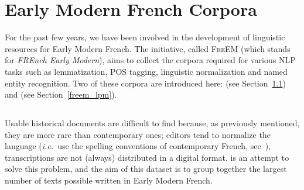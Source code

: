 \section{Early Modern French Corpora}\label{data-freem}

For the past few years, we have been involved in the development of linguistic resources for Early Modern French. The initiative, called \textsc{FreEM} (which stands for \emph{FREnch Early Modern}), aims to collect the corpora required for various NLP tasks such as lemmatization, POS tagging, linguistic normalization and named entity recognition. Two of these corpora are introduced here: \freemmax (see Section~\ref{freem_max}) and \freemlpm (see Section~\ref{freem_lpm}).

\subsection{\texorpdfstring{\freemmax}{FREEM max}}\label{freem_max}

Usable historical documents are difficult to find because, as previously mentioned, they are more rare than contemporary ones; editors tend to normalize the language (\emph{i.e.}~use the spelling conventions of contemporary French, see~\citep{gabay-2014-pourquoi}), transcriptions are not (always) distributed in a digital format. \freemmax \citep{gabay-etal-2022-FreEM} is an attempt to solve this problem, and the aim of this dataset is to group together the largest number of texts possible written in Early Modern French.


